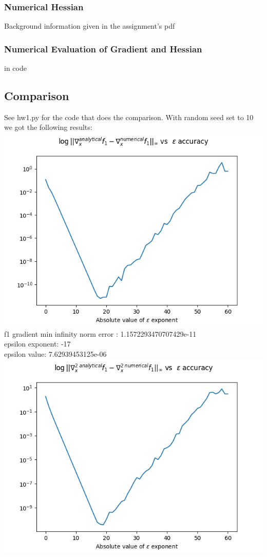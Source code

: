 \documentclass[12pt]{article}
\begin{document}
\subsubsection{Numerical Hessian}
Background information given in the assignment's pdf
\subsubsection{Numerical Evaluation of Gradient and Hessian}
in code

\newpage

\subsection{Comparison}
See hw1.py for the code that does the comparison.
With random seed set to 10 we got the following results:\\
\includegraphics[scale=0.7]{f1_grad_plot}\\
f1 gradient min infinity norm error : 1.1572293470707429e-11\\
epsilon exponent: -17\\
epsilon value: 7.62939453125e-06\\
\includegraphics[scale=0.7]{f1_hessian_plot}\\
\end{document}
